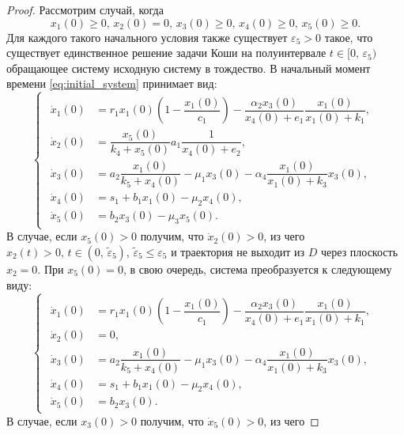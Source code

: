 \documentclass[14pt,a4paper]{extarticle}
\begin{document}
\begin{proof}
		Рассмотрим случай, когда
		\begin{equation}\label{eq:conds_5}
			x_1(0)\ge0,\, x_2(0)=0,\, x_3(0)\ge0,\, x_4(0)\ge0,\, x_5(0)\ge0.
		\end{equation}
		Для каждого такого начального условия также существует $\varepsilon_5>0$ такое, что существует единственное решение задачи Коши на полуинтервале $t\in[0,\,\varepsilon_5)$ обращающее систему исходную систему в тождество. В начальный момент времени \ref{eq:initial_system} принимает вид: 
		\begin{equation*}
			\begin{cases}
				\begin{aligned}
					\dot{x}_1(0) &= r_1x_1(0)\left(1-\dfrac{x_1(0)}{c_1}\right)-\dfrac{\alpha_2x_3(0)}{x_4(0)+e_1}\dfrac{x_1(0)}{x_1(0)+k_1},\\
					\dot{x}_2(0) &= \dfrac{x_5(0)}{k_4+x_5(0)}a_1\dfrac{1}{x_4(0)+e_2},\\
					\dot{x}_3(0) &= a_2\dfrac{x_1(0)}{k_5+x_4(0)}-\mu_1x_3(0)-\alpha_4\dfrac{x_1(0)}{x_1(0)+k_3}x_3(0),\\
					\dot{x}_4(0) &= s_1 + b_1x_1(0)-\mu_2x_4(0),\\
					\dot{x}_5(0) &= b_2x_3(0)-\mu_3x_5(0).
				\end{aligned}
			\end{cases}
		\end{equation*} 
		В случае, если $x_5(0)>0$ получим, что $\dot{x}_2(0)>0$, из чего $x_2(t)>0,\, t\in(0,\, \tilde{\varepsilon}_5),\,\tilde{\varepsilon}_5\le\varepsilon_5$ и траектория не выходит из $D$ через плоскость $x_2=0$. При $x_5(0)=0$, в свою очередь, система преобразуется к следующему виду:
		\begin{equation*}
			\begin{cases}
				\begin{aligned}
					\dot{x}_1(0) &= r_1x_1(0)\left(1-\dfrac{x_1(0)}{c_1}\right)-\dfrac{\alpha_2x_3(0)}{x_4(0)+e_1}\dfrac{x_1(0)}{x_1(0)+k_1},\\
					\dot{x}_2(0) &= 0,\\
					\dot{x}_3(0) &= a_2\dfrac{x_1(0)}{k_5+x_4(0)}-\mu_1x_3(0)-\alpha_4\dfrac{x_1(0)}{x_1(0)+k_3}x_3(0),\\
					\dot{x}_4(0) &= s_1 + b_1x_1(0)-\mu_2x_4(0),\\
					\dot{x}_5(0) &= b_2x_3(0).
				\end{aligned}
			\end{cases}
		\end{equation*}  
		В случае, если $x_3(0)>0$ получим, что $\dot{x}_5(0)>0$, из чего 

\end{proof}
\end{document}
